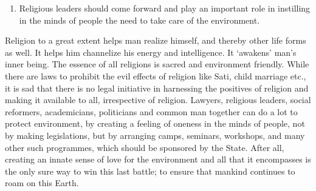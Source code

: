 \begin{multicols}{2}
\begin{enumerate}[label=$\bullet$]
\item Religious leaders should come forward and play an important role in instilling in the
minds of people the need to take care of the environment.
\end{enumerate}

\vspace{-.2cm}


\noi
Religion to a great extent helps man realize himself, and thereby other life forms as well. It
helps him channelize his energy and intelligence. It ‘awakens’ man’s inner being. The essence
of all religions is sacred and environment friendly. While there are laws to prohibit the evil
effects of religion like Sati, child marriage etc., it is sad that there is no legal initiative in
harnessing the positives of religion and making it available to all, irrespective of religion.
Lawyers, religious leaders, social reformers, academicians, politicians and common man
together can do a lot to protect environment, by creating a feeling of oneness in the minds of
people, not by making legislations, but by arranging camps, seminars, workshops, and many
other such programmes, which should be sponsored by the State. After all, creating an innate
sense of love for the environment and all that it encompasses is the only sure way to win this
last battle; to ensure that mankind continues to roam on this Earth.
\end{multicols}
	
